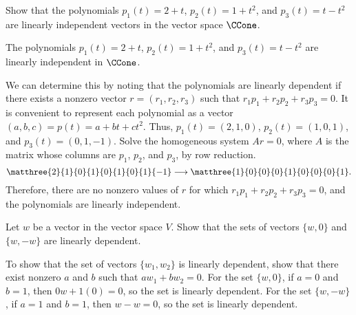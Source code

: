 \documentclass{article}
\begin{document}
\begin{exercise} \label{c5.4.5}
Show that the polynomials $p_1(t) = 2+t$, $p_2(t) = 1+t^2$, and
$p_3(t) = t-t^2$ are linearly independent vectors in the vector
space $\CCone$.

\begin{solution}

\ans The polynomials $p_1(t) = 2 + t$, $p_2(t) = 1 + t^2$, and $p_3(t) =
t - t^2$ are linearly independent in $\CCone$.  

\soln We can determine this
by noting that the polynomials are linearly dependent if there exists
a nonzero vector $r = (r_1,r_2,r_3)$ such that $r_1p_1 + r_2p_2 +
r_3p_3 = 0$.  It is convenient to represent each polynomial as a
vector $(a,b,c) = p(t) = a + bt + ct^2$.  Thus, $p_1(t) = (2,1,0)$, 
$p_2(t) = (1,0,1)$, and $p_3(t) = (0,1,-1)$.  Solve the homogeneous
system $Ar = 0$, where $A$ is the matrix whose columns are $p_1$,
$p_2$, and $p_3$, by row reduction.
\[ \matthree{2}{1}{0}{1}{0}{1}{0}{1}{-1} \longrightarrow
\matthree{1}{0}{0}{0}{1}{0}{0}{0}{1}. \]
Therefore, there are no nonzero values of $r$ for which $r_1p_1 + 
r_2p_2 + r_3p_3 = 0$, and the polynomials are linearly independent.


\end{solution}
\end{exercise}





\problemlabel

\begin{exercise} \label{c5.4.1}
Let $w$ be a vector in the vector space $V$.  Show that the sets of vectors
$\{w,0\}$ and $\{w,-w\}$ are linearly dependent.

\begin{solution}

To show that the set of vectors $\{w_1,w_2\}$ is linearly dependent,
show that there exist nonzero $a$ and $b$ such that
$aw_1 + bw_2 = 0$.  For the set $\{w,0\}$, if $a = 0$ and $b = 1$,
then $0w + 1(0) = 0$, so the set is linearly dependent.  For the
set $\{w,-w\}$, if $a = 1$ and $b = 1$, then
$w - w = 0$, so the set is linearly dependent.

\end{solution}
\end{exercise}


\end{document}
